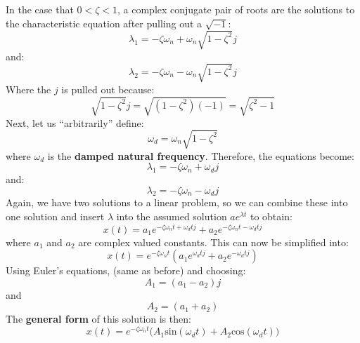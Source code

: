 \documentclass[12pt,a4paper]{article}
\begin{document}
 			In the case that $0<\zeta<1$, a complex conjugate pair of roots are the solutions to the characteristic equation after pulling out a $\sqrt{-1}$:
			\begin{equation}
				\lambda_{1} = -\zeta\omega_n + \omega_n \sqrt{1-\zeta^2}j
			\end{equation} 			
			and:
			\begin{equation}
				\lambda_{2} = -\zeta\omega_n - \omega_n \sqrt{1-\zeta^2}j
			\end{equation} 
			Where the $j$ is pulled out because:
			\begin{equation}
				\sqrt{1-\zeta^2}j = \sqrt{(1-\zeta^2)(-1)} = \sqrt{\zeta^2-1}
			\end{equation} 							
			Next, let us ``arbitrarily'' define:
			\begin{equation}
				\omega_d = \omega_n\sqrt{1-\zeta^2}
			\end{equation} 	
			where $\omega_d$ is the \textbf{damped natural frequency}. Therefore, the equations become:
			\begin{equation}
				\lambda_{1} = -\zeta\omega_n + \omega_dj
			\end{equation} 			
			and:
			\begin{equation}
				\lambda_{2} = -\zeta\omega_n - \omega_dj
			\end{equation} 	
			Again, we have two solutions to a linear problem, so we can combine these into one solution and insert $\lambda$ into the assumed solution $ae^{\lambda t}$ to obtain:
			\begin{equation}
				x(t) = a_1e^{-\zeta\omega_nt + \omega_dtj} + a_2e^{-\zeta\omega_nt - \omega_dtj} 
			\end{equation} 			
			where $a_1$ and $a_2$ are complex valued constants. This can now be simplified into:	
			\begin{equation}
				x(t) = e^{-\zeta\omega_nt}(a_1e^{\omega_dtj} + a_2e^{-\omega_dtj}) 
			\end{equation} 
			Using Euler's equations, (same as before) and choosing:
			\begin{equation}
				A_1=(a_1-a_2)j
			\end{equation} 	
			and
			\begin{equation}
				A_2=(a_1+a_2)
			\end{equation} 		
			The \textbf{general form} of this solution is then:
			\begin{equation}
				x(t) = e^{-\zeta\omega_nt}\big(A_1\text{sin}(\omega_dt) + A_2\text{cos}(\omega_dt)\big)
			\end{equation} 	
\end{document}
